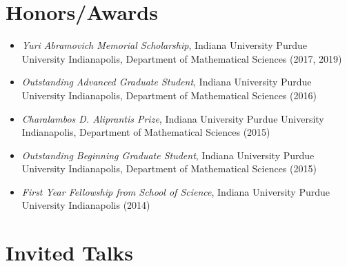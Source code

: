 \documentclass[11pt,letterpaper,roman,colorlinks,urlcolor=blue,linkcolor=blue
]{moderncv}
\begin{document}
\section{Honors/Awards}
\begin{itemize}[parsep=-0.2em, leftmargin=3.55cm]
    \item \textit{Yuri Abramovich Memorial Scholarship}, Indiana University Purdue University Indianapolis, Department of Mathematical Sciences (2017, 2019)
    \item \textit{Outstanding Advanced Graduate Student}, Indiana University Purdue University Indianapolis, Department of Mathematical Sciences (2016)
    \item \textit{Charalambos D. Aliprantis Prize}, Indiana University Purdue University Indianapolis, Department of Mathematical Sciences (2015)
    \item \textit{Outstanding Beginning Graduate Student}, Indiana University Purdue University Indianapolis, Department of Mathematical Sciences (2015)
    \item \textit{First Year Fellowship from School of Science}, Indiana University Purdue University Indianapolis (2014)
\end{itemize}



\section{Invited Talks}


\end{document}
